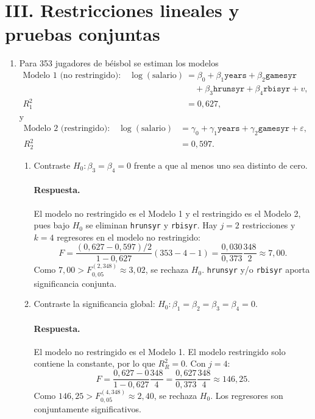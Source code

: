 \documentclass[letterpaper,11pt]{article}
\newcommand{\respuesta}{\color{blue}\paragraph{Respuesta.}}
\begin{document}
\section*{III. Restricciones lineales y pruebas conjuntas}

\begin{enumerate}[resume]

\item\color{black} Para 353 jugadores de béisbol se estiman los modelos
\[
\begin{aligned}
\text{Modelo 1 (no restringido):}\quad
\log(\text{salario})&=\beta_0+\beta_1\texttt{years}
 +\beta_2\texttt{gamesyr}\\
&\quad +\beta_3\texttt{hrunsyr}+\beta_4\texttt{rbisyr}+v,\\
R_1^2&=0{,}627,
\end{aligned}
\]
y
\[
\begin{aligned}
\text{Modelo 2 (restringido):}\quad
\log(\text{salario})&=\gamma_0+\gamma_1\texttt{years}
 +\gamma_2\texttt{gamesyr}+\varepsilon,\\
R_2^2&=0{,}597.
\end{aligned}
\]
\begin{enumerate}[label=(\alph*)]
    \item\color{black} Contraste $H_0:\beta_3=\beta_4=0$ frente a que al menos uno sea
    distinto de cero.

    \respuesta El modelo no restringido es el Modelo 1 y el restringido es el
    Modelo 2, pues bajo $H_0$ se eliminan \texttt{hrunsyr} y \texttt{rbisyr}.
    Hay $j=2$ restricciones y $k=4$ regresores en el modelo no restringido:
    \[
        F=\frac{(0{,}627-0{,}597)/2}{1-0{,}627}(353-4-1)
        =\frac{0{,}030}{0{,}373}\frac{348}{2}
        \approx 7{,}00.
    \]
    Como $7{,}00>F_{0{,}05}^{(2,348)}\approx3{,}02$, se rechaza $H_0$.
    \texttt{hrunsyr} y/o \texttt{rbisyr} aporta significancia conjunta.

    \item\color{black} Contraste la significancia global:
    $H_0:\beta_1=\beta_2=\beta_3=\beta_4=0$.

    \respuesta El modelo no restringido es el Modelo 1. El modelo restringido
    solo contiene la constante, por lo que $R_R^2=0$. Con $j=4$:
    \[
        F=\frac{0{,}627-0}{1-0{,}627}\frac{348}{4}
        =\frac{0{,}627}{0{,}373}\frac{348}{4}
        \approx146{,}25.
    \]
    Como $146{,}25>F_{0{,}05}^{(4,348)}\approx2{,}40$, se rechaza $H_0$.
    Los regresores son conjuntamente significativos.


\end{enumerate}
\end{enumerate}
\end{document}
